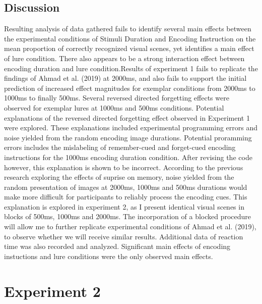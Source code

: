 \documentclass[
  english,
  man,floatsintext]{apa6}
\begin{document}
\hypertarget{discussion}{%
\subsection{Discussion}\label{discussion}}

Resulting analysis of data gathered fails to identify several main effects between the experimental conditions of Stimuli Duration and Encoding Instruction on the mean proportion of correctly recognized visual scenes, yet identifies a main effect of lure condition.
There also appears to be a strong interaction effect between encoding duration and lure condition.Results of experiment 1 fails to replicate the findings of Ahmad et al. (2019) at 2000ms, and also fails to support the initial prediction of increased effect magnitudes for exemplar conditions from 2000ms to 1000ms to finally 500ms. Several reversed directed forgetting effects were observed for exemplar lures at 1000ms and 500ms conditions. Potential explanations of the reversed directed forgetting effect observed in Experiment 1 were explored.
These explanations included experimental programming errors and noise yielded from the random encoding image durations.
Potential proramming errors includes the mislabeling of remember-cued and forget-cued encoding instructions for the 1000ms encoding duration condition. After revising the code however, this explanation is shown to be incorrect.
According to the previous research exploring the effects of suprise on memory, noise yielded from the random presentation of images at 2000ms, 1000ms and 500ms durations would make more difficult for participants to reliably process the encoding cues. This explanation is explored in experiment 2, as I present identical visual scenes in blocks of 500ms, 1000ms and 2000ms. The incorporation of a blocked procedure will allow me to further replicate experimental conditions of Ahmad et al. (2019), to observe whether we will receive similar results.
Additional data of reaction time was also recorded and analyzed. Significant main effects of encoding instuctions and lure conditions were the only observed main effects.

\hypertarget{experiment-2}{%
\section{Experiment 2}\label{experiment-2}}
\end{document}
